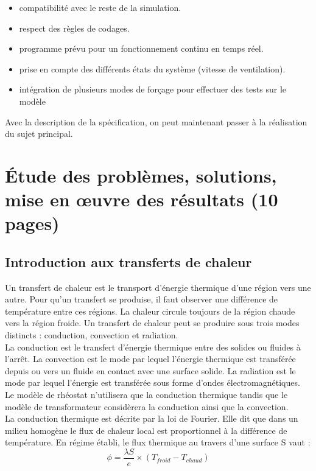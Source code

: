 \documentclass[a4paper]{report}
\begin{document}
	\begin{itemize}
		\item compatibilité avec le reste de la simulation.
		\item respect des règles de codages.
		\item programme prévu pour un fonctionnement continu en temps réel.
		\item prise en compte des différents états du système (vitesse de ventilation).
		\item intégration de plusieurs modes de forçage pour effectuer des tests sur le modèle
	\end{itemize}
	
	Avec la description de la spécification, on peut maintenant passer à la réalisation du sujet principal.
	\chapter{Étude des problèmes, solutions, mise en œuvre des résultats (10 pages)}
	
	
	\section{Introduction aux transferts de chaleur}
	Un transfert de chaleur est le transport d'énergie thermique d'une région vers une autre. Pour qu'un transfert se produise, il faut observer une différence de température entre ces régions. La chaleur circule toujours de la région chaude vers la région froide. Un transfert de chaleur peut se produire sous trois modes distincts : conduction, convection et radiation.\\
	La conduction est le transfert d'énergie thermique entre des solides ou fluides à l'arrêt. La convection est le mode par lequel l'énergie thermique est transférée depuis ou vers un fluide en contact avec une surface solide. La radiation est le mode par lequel l'énergie est transférée sous forme d'ondes électromagnétiques. Le modèle de rhéostat n'utilisera que la conduction thermique tandis que le modèle de transformateur considèrera la conduction ainsi que la convection.\\
	La conduction thermique est décrite par la loi de Fourier. Elle dit que dans un milieu homogène le flux de chaleur local est proportionnel à la différence de température. En régime établi, le flux thermique au travers d'une surface S vaut :
	\begin{equation}
		\phi = \frac{\lambda S}{e} \times (T_{froid} - T_{chaud} ) 
	\end{equation}
	
\end{document}
